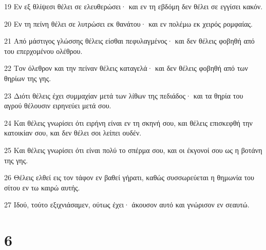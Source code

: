 \par 19 Εν εξ θλίψεσι θέλει σε ελευθερώσει· και εν τη εβδόμη δεν θέλει σε εγγίσει κακόν.
\par 20 Εν τη πείνη θέλει σε λυτρώσει εκ θανάτου· και εν πολέμω εκ χειρός ρομφαίας.
\par 21 Από μάστιγος γλώσσης θέλεις είσθαι πεφυλαγμένος· και δεν θέλεις φοβηθή από του επερχομένου ολέθρου.
\par 22 Τον όλεθρον και την πείναν θέλεις καταγελά· και δεν θέλεις φοβηθή από των θηρίων της γης.
\par 23 Διότι θέλεις έχει συμμαχίαν μετά των λίθων της πεδιάδος· και τα θηρία του αγρού θέλουσιν ειρηνεύει μετά σου.
\par 24 Και θέλεις γνωρίσει ότι ειρήνη είναι εν τη σκηνή σου, και θέλεις επισκεφθή την κατοικίαν σου, και δεν θέλει σοι λείπει ουδέν.
\par 25 Και θέλεις γνωρίσει ότι είναι πολύ το σπέρμα σου, και οι έκγονοί σου ως η βοτάνη της γης.
\par 26 Θέλεις ελθεί εις τον τάφον εν βαθεί γήρατι, καθώς συσσωρεύεται η θημωνία του σίτου εν τω καιρώ αυτής.
\par 27 Ιδού, τούτο εξιχνιάσαμεν, ούτως έχει· άκουσον αυτό και γνώρισον εν σεαυτώ.

\chapter{6}


